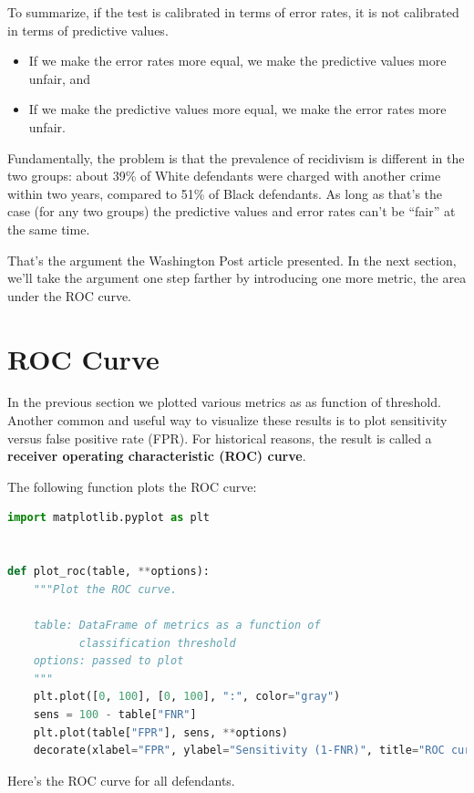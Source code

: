 To summarize, if the test is calibrated in terms of error rates, it is
not calibrated in terms of predictive values.

\begin{itemize}
\item
  If we make the error rates more equal, we make the predictive values
  more unfair, and
\item
  If we make the predictive values more equal, we make the error rates
  more unfair.
\end{itemize}

Fundamentally, the problem is that the prevalence of recidivism is
different in the two groups: about 39\% of White defendants were charged
with another crime within two years, compared to 51\% of Black
defendants. As long as that's the case (for any two groups) the
predictive values and error rates can't be ``fair'' at the same time.

That's the argument the Washington Post article presented. In the next
section, we'll take the argument one step farther by introducing one
more metric, the area under the ROC curve.

\section{ROC Curve}\label{roc-curve}

In the previous section we plotted various metrics as as function of
threshold. Another common and useful way to visualize these results is
to plot sensitivity versus false positive rate (FPR). For historical
reasons, the result is called a \textbf{receiver operating
characteristic (ROC) curve}.

The following function plots the ROC curve:

\begin{lstlisting}[language=Python,style=source]
import matplotlib.pyplot as plt


def plot_roc(table, **options):
    """Plot the ROC curve.

    table: DataFrame of metrics as a function of
           classification threshold
    options: passed to plot
    """
    plt.plot([0, 100], [0, 100], ":", color="gray")
    sens = 100 - table["FNR"]
    plt.plot(table["FPR"], sens, **options)
    decorate(xlabel="FPR", ylabel="Sensitivity (1-FNR)", title="ROC curve")
\end{lstlisting}

Here's the ROC curve for all defendants.

